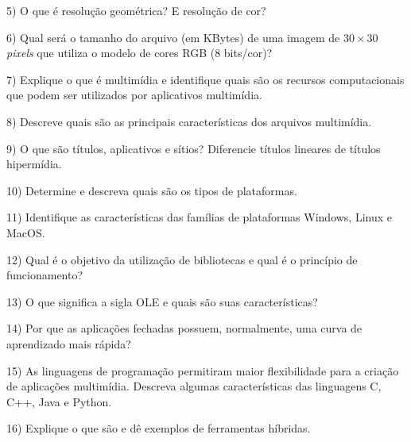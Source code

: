 \documentclass[a4paper,11pt]{article}
\begin{document}
5) O que é resolução geométrica? E resolução de cor?

\vspace{0.25cm}

6) Qual será o tamanho do arquivo (em KBytes) de uma imagem de $30 \times 30$
{\it pixels} que utiliza o modelo de cores RGB (8 bits/cor)?

\vspace{0.25cm}

7) Explique o que é multimídia e identifique quais são os recursos
computacionais que podem ser utilizados por aplicativos multimídia.

\vspace{0.25cm}

8) Descreve quais são as principais características dos arquivos multimídia.

\vspace{0.25cm}

9) O que são títulos, aplicativos e sítios? Diferencie títulos lineares de
títulos hipermídia.

\vspace{0.25cm}

10) Determine e descreva quais são os tipos de plataformas.

\vspace{0.25cm}

11) Identifique as características das famílias de plataformas Windows, Linux e
MacOS.

\vspace{0.25cm}

12) Qual é o objetivo da utilização de bibliotecas e qual é o princípio de
funcionamento?

\vspace{0.25cm}

13) O que significa a sigla OLE e quais são suas características?

\vspace{0.25cm}

14) Por que as aplicações fechadas possuem, normalmente, uma curva de
aprendizado mais rápida?

\vspace{0.25cm}

15) As linguagens de programação permitiram maior flexibilidade para a criação
de aplicações multimídia. Descreva algumas características das linguagens C,
C++, Java e Python.

\vspace{0.25cm}

16) Explique o que são e dê exemplos de ferramentas híbridas.
\end{document}
